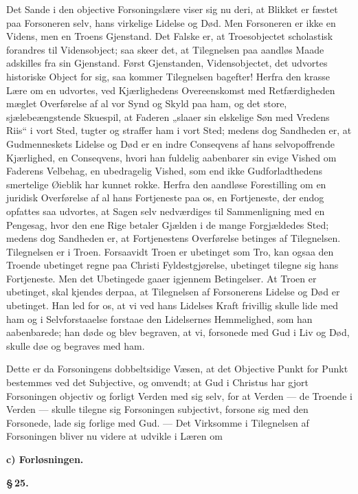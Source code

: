 \documentclass[12pt]{book}
\newcommand{\parmark}[1]{\begin{center}{\bfseries \S\,#1.}\end{center}}
\newcommand{\runhead}[1]{%
  \medskip\begin{center}{\bfseries #1}\end{center}\medskip}
\begin{document}
Det Sande i den objective Forsoningslære viser sig nu deri, at
Blikket er fæstet paa Forsoneren selv, hans virkelige Lidelse og
Død. Men Forsoneren er ikke en Videns, men en Troens Gjenstand. Det
Falske er, at Troesobjectet scholastisk forandres til Vidensobject;
saa skeer det, at Tilegnelsen paa aandløs Maade adskilles fra sin
Gjenstand. Først Gjenstanden, Vidensobjectet, det udvortes
historiske Object for sig, saa kommer Tilegnelsen bagefter! Herfra
den krasse Lære om en udvortes, ved Kjærlighedens Overeenskomst med
Retfærdigheden mæglet Overførelse af al vor Synd og Skyld paa ham,
og det store, sjælebeængstende Skuespil, at Faderen „slaaer sin
elskelige Søn med Vredens Riis“ i vort Sted, tugter og straffer ham
i vort Sted; medens dog Sandheden er, at Gudmenneskets Lidelse og
Død er en indre Conseqvens af hans selvopoffrende Kjærlighed, en
Conseqvens, hvori
han fuldelig aabenbarer sin evige Vished om Faderens Velbehag, en
ubedragelig Vished, som end ikke Gudforladthedens smertelige Øieblik
har kunnet rokke. Herfra den aandløse Forestilling om en juridisk
Overførelse af al hans Fortjeneste paa os, en Fortjeneste, der endog
opfattes saa udvortes, at Sagen selv nedværdiges til Sammenligning
med en Pengesag, hvor den ene Rige betaler Gjælden i de mange
Forgjældedes Sted; medens dog Sandheden er, at Fortjenestens
Overførelse betinges af Tilegnelsen. Tilegnelsen er i Troen.
Forsaavidt Troen er ubetinget som Tro, kan ogsaa den Troende
ubetinget regne paa Christi Fyldestgjørelse, ubetinget tilegne sig
hans Fortjeneste. Men det Ubetingede gaaer igjennem Betingelser. At
Troen er ubetinget, skal kjendes derpaa, at Tilegnelsen af
Forsonerens Lidelse og Død er ubetinget. Han led for os, at vi ved
hans Lidelses Kraft frivillig skulle lide med ham og i
Selvforstaaelse forstaae den Lidelsernes Hemmelighed, som han
aabenbarede; han døde og blev begraven, at vi, forsonede med Gud i
Liv og Død, skulle døe og begraves med ham.

Dette er da Forsoningens dobbeltsidige Væsen, at det Objective Punkt
for Punkt bestemmes ved det Subjective, og omvendt; at Gud i
Christus har gjort Forsoningen objectiv og forligt Verden med sig
selv, for at Verden --- de Troende i Verden --- skulle tilegne sig
Forsoningen subjectivt, forsone sig med den Forsonede, lade sig
forlige med Gud. --- Det Virksomme i Tilegnelsen af Forsoningen
bliver nu videre at udvikle i Læren om

\runhead{c) Forløsningen.}
\parmark{25}
\end{document}
